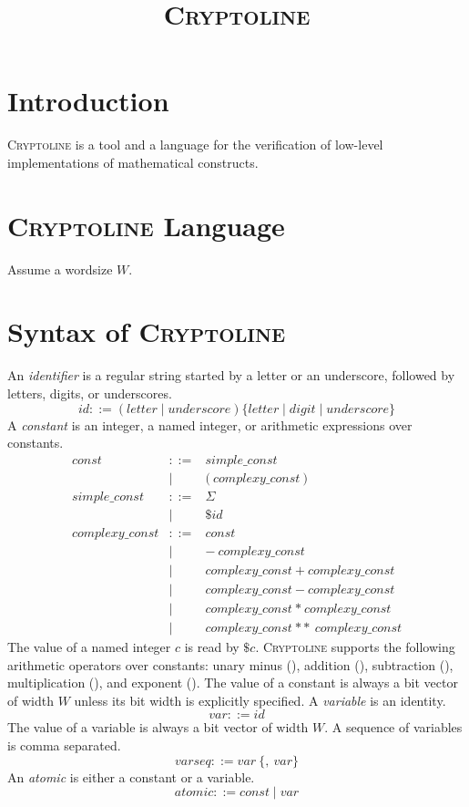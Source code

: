 \documentclass{article}
\newcommand{\derefop}{\mathit{\$}}
\newcommand{\wordsize}{W\xspace}
\newcommand{\cryptoline}{\textsc{Cryptoline}\xspace}
\newcommand{\minusop}{-\xspace}
\newcommand{\addop}{+\xspace}
\newcommand{\subop}{-\xspace}
\newcommand{\mulop}{*\xspace}
\newcommand{\powop}{**\xspace}
\newcommand{\varseq}{\mathit{varseq}\xspace}
\newcommand{\atomic}{\mathit{atomic}\xspace}
\newcommand{\var}{\mathit{var}\xspace}
\newcommand{\simpleconst}{\mathit{simple\_const}\xspace}
\newcommand{\complexconst}{\mathit{complexy\_const}\xspace}
\newcommand{\const}{\mathit{const}\xspace}
\newcommand{\id}{\mathit{id}\xspace}
\newcommand{\letter}{\mathit{letter}\xspace}
\newcommand{\digit}{\mathit{digit}\xspace}
\newcommand{\underscore}{\mathit{underscore}\xspace}
\begin{document}
\title{\cryptoline}

\maketitle

\section{Introduction}

\cryptoline is a tool and a language for the verification of low-level
implementations of mathematical constructs.

\section{\cryptoline Language}

Assume a wordsize $\wordsize$.


\appendix
\section{Syntax of \cryptoline}
An \emph{identifier} is a regular string started by a letter or an underscore, followed by letters, digits, or underscores.
\[
\id ::= (\letter \mid \underscore) \{ \letter \mid \digit \mid \underscore \}
\]
A \emph{constant} is an integer, a named integer, or arithmetic expressions over constants.
\[
\begin{array}{rcl}
\const &  ::= & \simpleconst \\
       & \mid & \pmb{(}\ \complexconst\ \pmb{)} \\
\simpleconst &  ::= & \Sigma \\
             & \mid & \pmb{\derefop} \id \\
\complexconst &  ::= & \const \\
              & \mid & \pmb{\minusop}\ \complexconst \\
              & \mid & \complexconst\ \pmb{\addop}\ \complexconst \\
              & \mid & \complexconst\ \pmb{\subop}\ \complexconst \\
              & \mid & \complexconst\ \pmb{\mulop}\ \complexconst \\
              & \mid & \complexconst\ \pmb{\powop}\ \complexconst
\end{array}
\]
The value of a named integer $c$ is read by $\$c$.
\cryptoline supports the following arithmetic operators over constants: unary minus (\pmb{-}), addition (\pmb{+}), subtraction (\pmb{-}), multiplication (\pmb{*}), and exponent (\pmb{**}).
The value of a constant is always a bit vector of width $\wordsize$ unless its bit width is explicitly specified.
A \emph{variable} is an identity.
\[
\var ::= \id
\]
The value of a variable is always a bit vector of width $\wordsize$.
A sequence of variables is comma separated.
\[
\varseq ::= \var\ \{ \pmb{,}\ \var \}
\]
An \emph{atomic} is either a constant or a variable.
\[
\atomic ::= \const \mid \var
\]
\end{document}
